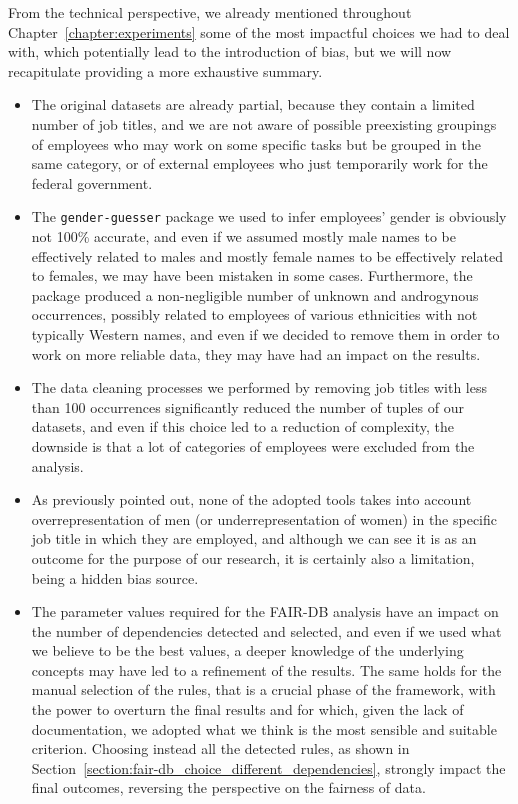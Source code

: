 From the technical perspective, we already mentioned throughout Chapter~\ref{chapter:experiments} some of the most impactful choices we had to deal with, which potentially lead to the introduction of bias, but we will now recapitulate providing a more exhaustive summary.
\begin{itemize}
\item The original datasets are already partial, because they contain a limited number of job titles, and we are not aware of possible preexisting groupings of employees who may work on some specific tasks but be grouped in the same category, or of external employees who just temporarily work for the federal government.
\item The \texttt{gender-guesser} package we used to infer employees' gender is obviously not 100\% accurate, and even if we assumed mostly male names to be effectively related to males and mostly female names to be effectively related to females, we may have been mistaken in some cases. Furthermore, the package produced a non-negligible number of unknown and androgynous occurrences, possibly related to employees of various ethnicities with not typically Western names, and even if we decided to remove them in order to work on more reliable data, they may have had an impact on the results.
\item The data cleaning processes we performed by removing job titles with less than 100 occurrences significantly reduced the number of tuples of our datasets, and even if this choice led to a reduction of complexity, the downside is that a lot of categories of employees were excluded from the analysis.
\item As previously pointed out, none of the adopted tools takes into account overrepresentation of men (or underrepresentation of women) in the specific job title in which they are employed, and although we can see it is as an outcome for the purpose of our research, it is certainly also a limitation, being a hidden bias source.
\item The parameter values required for the FAIR-DB analysis have an impact on the number of dependencies detected and selected, and even if we used what we believe to be the best values, a deeper knowledge of the underlying concepts may have led to a refinement of the results. The same holds for the manual selection of the rules, that is a crucial phase of the framework, with the power to overturn the final results and for which, given the lack of documentation, we adopted what we think is the most sensible and suitable criterion. Choosing instead all the detected rules, as shown in Section~\ref{section:fair-db_choice_different_dependencies}, strongly impact the final outcomes, reversing the perspective on the fairness of data.

\end{itemize}
